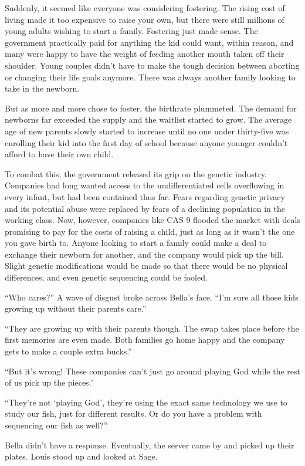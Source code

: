 \documentclass[12pt, fleqn, AofM.tex]{subfiles}
\begin{document}
Suddenly, it seemed like everyone was considering fostering. The rising cost of living made it too expensive to raise your own, but there were still millions of young adults wishing to start a family. Fostering just made sense. The government practically paid for anything the kid could want, within reason, and many were happy to have the weight of feeding another mouth taken off their shoulder. Young couples didn't have to make the tough decision between aborting or changing their life goals anymore. There was always another family looking to take in the newborn. 

But as more and more chose to foster, the birthrate plummeted. The demand for newborns far exceeded the supply and the waitlist started to grow. The average age of new parents slowly started to increase until no one under thirty-five was enrolling their kid into the first day of school because anyone younger couldn't afford to have their own child. 

To combat this, the government released its grip on the genetic industry. Companies had long wanted access to the undifferentiated cells overflowing in every infant, but had been contained thus far. Fears regarding genetic privacy and its potential abuse were replaced by fears of a declining population in the working class. Now, however, companies like CAS-9 flooded the market with deals promising to pay for the costs of raising a child, just as long as it wasn't the one you gave birth to. Anyone looking to start a family could make a deal to exchange their newborn for another, and the company would pick up the bill. Slight genetic modifications would be made so that there would be no physical differences, and even genetic sequencing could be fooled. 

“Who cares?” A wave of disgust broke across Bella's face. “I'm sure all those kids growing up without their parents care.”

“They are growing up with their parents though. The swap takes place before the first memories are even made. Both families go home happy and the company gets to make a couple extra bucks.”

“But it's wrong! These companies can't just go around playing God while the rest of us pick up the pieces.”

“They're not ‘playing God', they're using the exact same technology we use to study our fish, just for different results. Or do you have a problem with sequencing our fish as well?”

Bella didn't have a response. Eventually, the server came by and picked up their plates. Louis stood up and looked at Sage.
\end{document}
